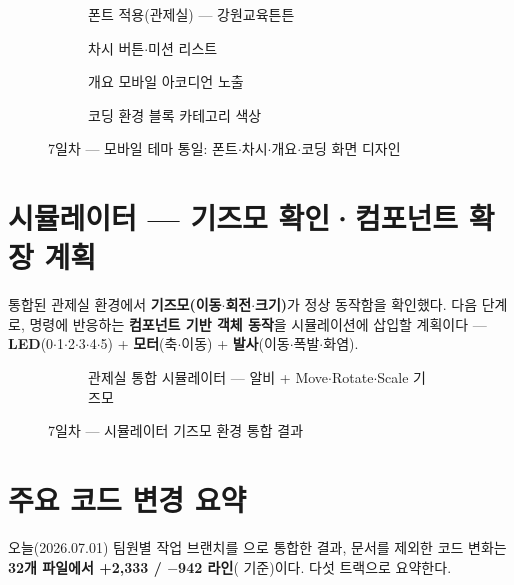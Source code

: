 \begin{figure}[htbp]\centering
  \begin{subfigure}{0.46\linewidth}\centering
    \caption{폰트 적용(관제실) — 강원교육튼튼}
  \end{subfigure}\hfill
  \begin{subfigure}{0.46\linewidth}\centering
    \caption{차시 버튼$\cdot$미션 리스트}
  \end{subfigure}

  \medskip
  \begin{subfigure}{0.46\linewidth}\centering
    \caption{개요 모바일 아코디언 노출}
  \end{subfigure}\hfill
  \begin{subfigure}{0.46\linewidth}\centering
    \caption{코딩 환경 블록 카테고리 색상}
  \end{subfigure}
  \caption{7일차 — 모바일 테마 통일: 폰트$\cdot$차시$\cdot$개요$\cdot$코딩 화면 디자인}
\end{figure}

\section{시뮬레이터 — 기즈모 확인·컴포넌트 확장 계획}
통합된 관제실 환경에서 \textbf{기즈모(이동$\cdot$회전$\cdot$크기)}가 정상 동작함을 확인했다. 다음
단계로, 명령에 반응하는 \textbf{컴포넌트 기반 객체 동작}을 시뮬레이션에 삽입할 계획이다 ---
\textbf{LED}(0$\cdot$1$\cdot$2$\cdot$3$\cdot$4$\cdot$5) + \textbf{모터}(축$\cdot$이동) +
\textbf{발사}(이동$\cdot$폭발$\cdot$화염).

\smallskip
\noindent{} 

\begin{figure}[htbp]\centering
  \begin{subfigure}{0.62\linewidth}\centering
    \caption{관제실 통합 시뮬레이터 — 알비 + Move$\cdot$Rotate$\cdot$Scale 기즈모}
  \end{subfigure}
  \caption{7일차 — 시뮬레이터 기즈모 환경 통합 결과}
\end{figure}

\section{주요 코드 변경 요약}
오늘(2026.07.01) 팀원별 작업 브랜치를 으로 통합한 결과, 문서를 제외한 코드 변화는
\textbf{32개 파일에서 +2,333 / $-$942 라인}( 기준)이다. 다섯 트랙으로 요약한다.

